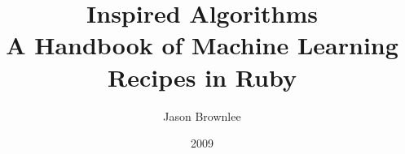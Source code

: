 \lstset{style=colorruby}


% 
% 







%
%

\newcommand{\blanknonumber}{\newpage\thispagestyle{empty}}



% 
\setcounter{tocdepth}{1}


%
%
\makeatletter
\def\thickhrulefill{\leavevmode \leaders \hrule height 1pt\hfill \kern \z@}
\renewcommand{\maketitle}{\begin{titlepage}%
    \let\footnotesize\small
    \let\footnoterule\relax
    \parindent \z@
    \reset@font
    \null
    \vskip 10\p@
    \hbox{\mbox{\hspace{3em}}%
      \vrule depth 0.6\textheight%
      \mbox{\hspace{2em}}
      \vbox{
        \vskip 40\p@
        \begin{flushleft}
          \Large \@author \par
        \end{flushleft}
        \vskip 70\p@
        \begin{flushleft}
          \Huge \bfseries \@title \par
        \end{flushleft}
        \vfil
        }}
    \null
  \end{titlepage}%
  \setcounter{footnote}{0}%
}
\makeatother
\author{Jason Brownlee}
\title{Inspired Algorithms\\ {\large A Handbook of Machine Learning Recipes in Ruby}}
\date{2009}
